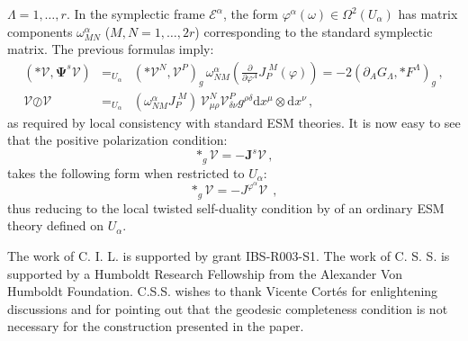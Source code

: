 \documentclass[10pt, cmp, numbook, final, a4paper]{svjour}
\def\dd{\mathrm{d}}
\def\bJ{\mathbf{J}}
\def\bJ{\mathbf{J}}
\def\bPsi{\mathbf{\Psi}}
\def\loslash{\bm{\oslash}}
\def\cE{\check{E}}
\def\cV{\mathcal{V}}
\def\cE{\mathcal{E}}
\def\bcV{\boldsymbol{\cV}}
\begin{document}
$\Lambda = 1,\hdots,r$. In the symplectic frame $\cE^{\alpha}$, the
form $\varphi^{\alpha}(\omega)\in \Omega^2(U_\alpha)$ has matrix
components $\omega^{\alpha}_{MN}$ ($M, N =1,\hdots, 2r$) corresponding
to the standard symplectic matrix. The previous formulas imply:
\begin{eqnarray*}
(\ast \bcV , \bPsi^s\bcV) &=_{U_{\alpha}}&
(\ast\cV^{N}, \cV^{P})_{g}\, \omega^{\alpha}_{NM}
\left(\frac{\partial}{\partial \varphi^{A}} J_{P}^{\,\,
  M}(\varphi)\right) = -2 (\partial_{A} G_{\Lambda}, \ast
F^{\Lambda})_{g}\, ,\\ \bcV\loslash \bcV &=_{U_{\alpha}}&
(\omega^{\alpha}_{NM} J_{P}^{\,\, M})\, \cV^{N}_{\mu\rho}
\cV^{P}_{\delta\nu} g^{\rho\delta} \dd x^{\mu}\otimes \dd x^{\nu}\, ,
\end{eqnarray*}
as required by local consistency with standard ESM
theories. It is now easy to see that the
positive polarization condition:
\begin{equation*}
\ast_g \bcV=-\bJ^s\bcV\, ,
\end{equation*}
takes the following form when restricted to $U_{\alpha}$:
\begin{equation}
\label{eq:twistedself}
\ast_{g}\cV = -J^{\varphi^{\alpha}} \cV~~,
\end{equation}
thus reducing to the local twisted self-duality condition 
by of an ordinary ESM theory defined on $U_\alpha$.

\begin{acknowledgements}
The work of C. I. L. is supported by grant IBS-R003-S1. The work of
C. S. S. is supported by a Humboldt Research Fellowship from the
Alexander Von Humboldt Foundation. C.S.S. wishes to thank Vicente
Cort\'es for enlightening discussions and for pointing out that the
geodesic completeness condition is not necessary for the construction
presented in the paper.
\end{acknowledgements}
\end{document}
